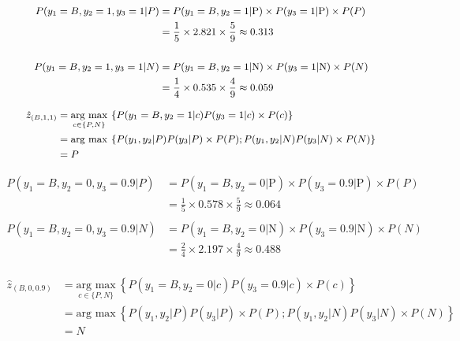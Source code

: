 \documentclass[12pt]{article}
\begin{document}
\begin{enumerate}[leftmargin=\labelsep]
    \begin{equation*}
        \small
        \begin{aligned}
        P(y_1 = B, y_2 = 1, y_3 = 1 | P) &= P(y_1 = B, y_2 = 1 | \text{P}) \times P(y_3 = 1 | \text{P}) \times P(P) \\
        &= \frac{1}{5} \times 2.821 \times \frac{5}{9} \approx 0.313\\
        \\
        P(y_1 = B, y_2 = 1, y_3 = 1 | N) &= P(y_1 = B, y_2 = 1 | \text{N}) \times P(y_3 = 1 | \text{N}) \times P(N) \\
        &= \frac{1}{4} \times 0.535 \times \frac{4}{9} \approx 0.059\\
        \end{aligned}
    \end{equation*}
    
    \begin{equation*}
        \small
        \begin{aligned}
            \hat{z}_{(B, 1, 1)} &= \underset{c \in \{P,N\}}{\text{arg max}} \medspace \left\{P(y_1 = B, y_2 = 1 | c) P(y_3 = 1| c) \times P(c)\right\}\\
                          & = \text{arg max} \medspace \left\{P(y_1, y_2 | P) P(y_3| P) \times P(P); P(y_1, y_2 | N) P(y_3| N) \times P(N)\right\} \\
                          & = P
        \end{aligned}
    \end{equation*}

    \begin{equation*}
        \begin{aligned}
        P(y_1 = B, y_2 = 0, y_3 = 0.9 | P) &= P(y_1 = B, y_2 = 0 | \text{P}) \times P(y_3 = 0.9 | \text{P}) \times P(P) \\
        &= \frac{1}{5} \times 0.578 \times \frac{5}{9} \approx 0.064\\
        \\
        P(y_1 = B, y_2 = 0, y_3 = 0.9 | N) &= P(y_1 = B, y_2 = 0 | \text{N}) \times P(y_3 = 0.9 | \text{N}) \times P(N) \\
        &= \frac{2}{4} \times 2.197 \times \frac{4}{9} \approx 0.488\\
        \end{aligned}
    \end{equation*}

    \begin{equation*}
        \begin{aligned}
            \hat{z}_{(B, 0, 0.9)} &= \underset{c \in \{P,N\}}{\text{arg max}} \medspace \left\{P(y_1 = B, y_2 = 0 | c) P(y_3 = 0.9| c) \times P(c)\right\}\\
                          & = \text{arg max} \medspace \left\{P(y_1, y_2 | P) P(y_3| P) \times P(P); P(y_1, y_2 | N) P(y_3| N) \times P(N)\right\} \\
                          & = N 
        \end{aligned}
    \end{equation*}


\end{enumerate}
\end{document}
